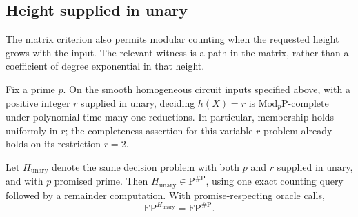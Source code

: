 \subsection{Height supplied in unary}
The matrix criterion also permits modular counting when the requested
height grows with the input. The relevant witness is a path in the
matrix, rather than a coefficient of degree exponential in that height.

\begin{theorem}\label{thm:unary-height}
Fix a prime $p$. On the smooth homogeneous circuit inputs specified
above, with a positive integer $r$ supplied in unary, deciding
$h(X)=r$ is $\mathrm{Mod}_p\mathrm P$-complete under polynomial-time
many-one reductions. In particular, membership holds uniformly in $r$;
the completeness assertion for this variable-$r$ problem already holds
on its restriction $r=2$.

Let $H_{\mathrm{unary}}$ denote the same decision problem with both
$p$ and $r$ supplied in unary, and with $p$ promised prime. Then
$H_{\mathrm{unary}}\in\mathrm P^{\#\mathrm P}$, using one exact
counting query followed by a remainder computation. With
promise-respecting oracle calls,
\[
 \mathrm{FP}^{H_{\mathrm{unary}}}=\mathrm{FP}^{\#\mathrm P}.
\]
\end{theorem}
